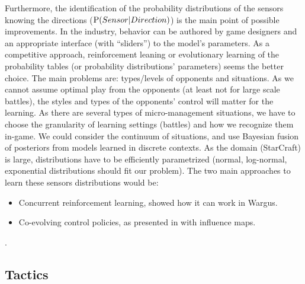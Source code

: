 Furthermore, the identification of the probability distributions of the sensors knowing the directions ($\mathrm{P}(Sensor|Direction)$) is the main point of possible improvements. In the industry, behavior can be authored by game designers and an appropriate interface (with ``sliders'') to the model's parameters. As a competitive approach, reinforcement leaning or evolutionary learning of the probability tables (or probability distributions' parameters) seems the better choice. The main problems are: types/levels of opponents and situations. As we cannot assume optimal play from the opponents (at least not for large scale battles), the styles and types of the opponents' control will matter for the learning. As there are several types of micro-management situations, we have to choose the granularity of learning settings (battles) and how we recognize them in-game. We could consider the continuum of situations, and use Bayesian fusion of posteriors from models %
learned in discrete contexts. As the domain (StarCraft) is large, distributions have to be efficiently parametrized (normal, log-normal, exponential distributions should fit our problem). The two main approaches to learn these sensors distributions would be:
\begin{itemize}
    \item Concurrent reinforcement learning, \citep{Marthi05concurrenthierarchical} showed how it can work in Wargus.
    \item Co-evolving control policies, as presented in \citep{Miles2007,Avery09} with influence maps.
\end{itemize}.

\subsection{Tactics}

